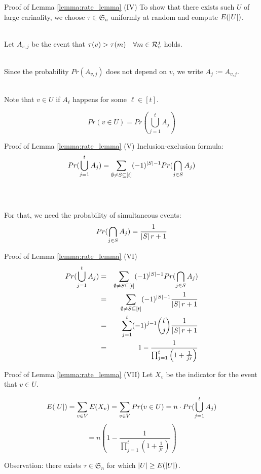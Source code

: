 \begin{frame}{Proof of Lemma \ref{lemma:rate_lemma} (IV)}
    To show that there exists such $U$ of large carinality, we choose $\tau \in \mathfrak{S}_n$ uniformly at random and compute $E(\left\vert {U} \right\vert)$. \\~\\ \pause
    
    Let $A_{v,j}$ be the event that $\tau(v) > \tau(m) \quad \forall m \in \mathcal{R}_v^j$ holds.\\~\\ \pause
    
    Since the probability $Pr(A_{v,j})$ does not depend on $v$, we write $A_{j} :=  A_{v,j}$.\\~\\ \pause
    
    Note that $v \in U$ if $A_{\ell}$ happens for some $\ell \in [t]$. \pause
    
    $$Pr(v \in U) = Pr(\bigcup_{j=1}^{t} A_j)$$
\end{frame}

\begin{frame}{Proof of Lemma \ref{lemma:rate_lemma} (V)}
    Inclusion-exclusion formula: 
    $$Pr(\bigcup_{j=1}^{t} A_j) = \sum_{\emptyset \neq S \subseteq [t]} (-1)^{\left\vert {S} \right\vert - 1} Pr( \bigcap_{j\in S} A_j )$$ \\~\\ \pause
    
    For that, we need the probability of simultaneous events:
    $$
        Pr(\bigcap_{j\in S} A_j ) = \frac{1}{\left\vert {S} \right\vert r+1}
    $$
\end{frame}

\begin{frame}{Proof of Lemma \ref{lemma:rate_lemma} (VI)}
        \begin{align*}
            Pr(\bigcup_{j=1}^{t} A_j) & = & \sum_{\emptyset \neq S \subseteq [t]} (-1)^{\left\vert {S} \right\vert - 1} Pr( \bigcap_{j\in S} A_j ) \\
            & = & \sum_{\emptyset \neq S \subseteq [t]} (-1)^{\left\vert {S} \right\vert - 1} \frac{1}{\left\vert {S} \right\vert r+1} \\
            & = & \sum_{j=1}^{t} (-1)^{j - 1} \binom{t}{j} \frac{1}{\left\vert {S} \right\vert r+1} \\
            & = & 1 - \frac{1}{ \prod_{j=1}^{t} \left(1 + \frac{1}{jr} \right) }
        \end{align*}
\end{frame}

\begin{frame}{Proof of Lemma \ref{lemma:rate_lemma} (VII)}
    Let $X_v$ be the indicator for the event that $v \in U$.
    
    $$
        E(\left\vert {U} \right\vert)
        = \sum_{v \in V} E(X_v)
        = \sum_{v \in V} Pr(v \in U)
        = n \cdot Pr(\bigcup_{j=1}^{t} A_j)
    $$
    $$
        = n (1 - \frac{1}{ \prod_{j=1}^{t} \left(1 + \frac{1}{jr} \right) })
    $$
    
    Observation: there exists $\tau \in \mathfrak{S}_n$ for which $\left\vert {U} \right\vert \geq E(\left\vert {U} \right\vert)$.
\end{frame}

